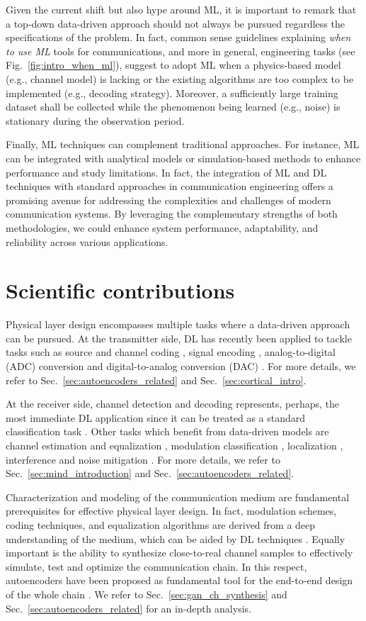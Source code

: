 Given the current shift but also hype around ML, it is important to remark that a top-down data-driven approach should not always be pursued regardless the specifications of the problem. In fact, common sense guidelines \cite{Simeone2018} explaining \textit{when to use ML} tools for communications, and more in general, engineering tasks (see Fig.~\ref{fig:intro_when_ml}), suggest to adopt ML when a physics-based model (e.g., channel model) is lacking or the existing algorithms are too complex to be implemented (e.g., decoding strategy). Moreover, a sufficiently large training dataset shall be collected while the phenomenon being learned (e.g., noise) is stationary during the observation period. 

Finally, ML techniques can complement traditional approaches. For instance, ML can be integrated with analytical models or simulation-based methods to enhance performance and study limitations. In fact, the integration of ML and DL techniques with standard approaches in communication engineering offers a promising avenue for addressing the complexities and challenges of modern communication systems. By leveraging the complementary strengths of both methodologies, we could enhance system performance, adaptability, and reliability across various applications. 

\section{Scientific contributions}
Physical layer design encompasses multiple tasks where a data-driven approach can be pursued. 
At the transmitter side, DL has recently been applied to tackle tasks such as source and channel coding \cite{8461983}, signal encoding \cite{Dorner2018}, analog-to-digital (ADC) conversion and digital-to-analog conversion (DAC) \cite{8807322}. For more details, we refer to Sec.~\ref{sec:autoencoders_related} and Sec.~\ref{sec:cortical_intro}.

At the receiver side, channel detection and decoding represents, perhaps, the most immediate DL application since it can be treated as a standard classification task \cite{Nachmani2018}. Other tasks which benefit from data-driven models are channel estimation and equalization \cite{8353153}, modulation classification \cite{Oshea2017}, localization \cite{8482358}, interference and noise mitigation \cite{9802083}. For more details, we refer to Sec.~\ref{sec:mind_introduction} and Sec.~\ref{sec:autoencoders_related}.

Characterization and modeling of the communication medium are fundamental prerequisites for effective physical layer design. In fact, modulation schemes, coding techniques, and equalization algorithms are derived from a deep understanding of the medium, which can be aided by DL techniques \cite{8644250}. Equally important is the ability to synthesize close-to-real channel samples \cite{8792076} to effectively simulate, test and optimize the communication chain. In this respect, autoencoders have been proposed as fundamental tool for the end-to-end design of the whole chain \cite{Oshea2017}. We refer to Sec.~\ref{sec:gan_ch_synthesis} and Sec.~\ref{sec:autoencoders_related} for an in-depth analysis. 

